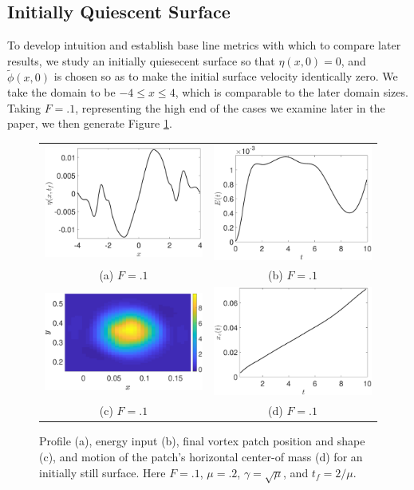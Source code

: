 \documentclass[a4paper,11pt]{article}
\begin{document}
\subsection*{Initially Quiescent Surface}
To develop intuition and establish base line metrics with which to compare later results, we study an initially quiesecent surface so that $\eta(x,0)=0$, and $\tilde{\phi}(x,0)$ is chosen so as to make the initial surface velocity identically zero.  We take the domain to be $-4\leq x \leq 4$, which is comparable to the later domain sizes.  Taking $F=.1$, representing the high end of the cases we examine later in the paper, we then generate Figure \ref{fig:still}.
\begin{figure}
\centering
\begin{tabular}{cc}
\includegraphics[width=.35\textwidth]{profile_mu_0} & \includegraphics[width=.35\textwidth]{energy_mu_0}\\
(a)  $F=.1$ & (b)  $F=.1$\\
\includegraphics[width=.35\textwidth]{vorticity_mu_0} & \includegraphics[width=.35\textwidth]{com_mu_0}\\
(c)  $F=.1$ & (d)  $F=.1$
\end{tabular}
\caption{Profile (a), energy input (b), final vortex patch position and shape (c), and motion of the patch's horizontal center-of mass (d) for an initially still surface.  Here $F=.1$, $\mu=.2$, $\gamma = \sqrt{\mu}$, and $t_{f}=2/\mu$.}
\label{fig:still}
\end{figure}
\end{document}
